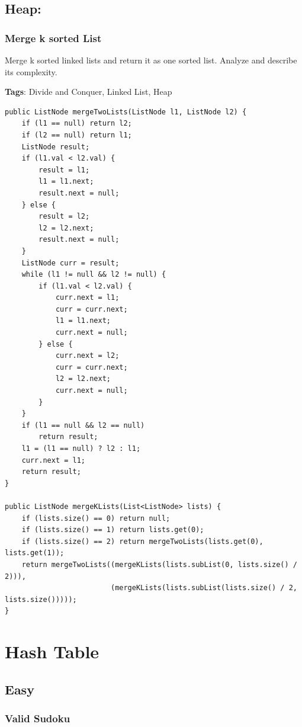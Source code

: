 \documentclass[11pt]{book}
\begin{document}
\section{Heap:}
\label{sec-5-6}
\subsection{Merge k sorted List}
\label{sec-5-6-1}
Merge k sorted linked lists and return it as one sorted list. Analyze and describe its complexity.

\textbf{Tags}: Divide and Conquer, Linked List, Heap
\lstset{language=java,label= ,caption= ,numbers=none}
\begin{lstlisting}
public ListNode mergeTwoLists(ListNode l1, ListNode l2) {
    if (l1 == null) return l2;
    if (l2 == null) return l1;
    ListNode result;
    if (l1.val < l2.val) {
        result = l1;
        l1 = l1.next;
        result.next = null;
    } else {
        result = l2;
        l2 = l2.next;
        result.next = null;
    }
    ListNode curr = result;
    while (l1 != null && l2 != null) {
        if (l1.val < l2.val) {
            curr.next = l1;
            curr = curr.next;
            l1 = l1.next;
            curr.next = null;
        } else {
            curr.next = l2;
            curr = curr.next;
            l2 = l2.next;
            curr.next = null;
        }
    }
    if (l1 == null && l2 == null)
        return result;
    l1 = (l1 == null) ? l2 : l1;
    curr.next = l1;
    return result;
}

public ListNode mergeKLists(List<ListNode> lists) {
    if (lists.size() == 0) return null;
    if (lists.size() == 1) return lists.get(0);
    if (lists.size() == 2) return mergeTwoLists(lists.get(0), lists.get(1));
    return mergeTwoLists((mergeKLists(lists.subList(0, lists.size() / 2))),
                         (mergeKLists(lists.subList(lists.size() / 2, lists.size()))));
}
\end{lstlisting}

\chapter{Hash Table}
\label{sec-6}
\section{Easy}
\label{sec-6-1}
\subsection{Valid Sudoku}
\label{sec-6-1-1}
\end{document}
